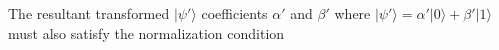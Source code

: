 \documentclass[preview]{standalone}
\begin{document}
\begin{center}
The resultant transformed $|\psi'\rangle$ coefficients $\alpha'$ and $\beta'$ where $|\psi'\rangle = \alpha'|0\rangle + \beta'|1\rangle$ must also satisfy the normalization condition
\end{center}
\end{document}
